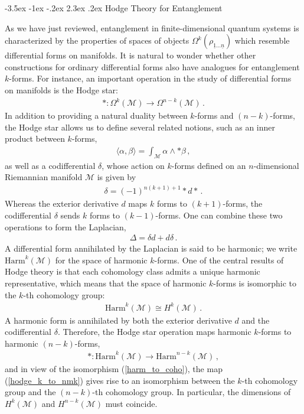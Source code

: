 \documentclass[12pt]{article}
\makeatletter
\newcommand{\ul}[1]{{\underline{#1}}}
\renewcommand\section{\@startsection {section}{1}{\z@}%
                                   {-3.5ex \@plus -1ex \@minus -.2ex}%
                                   {2.3ex \@plus.2ex}%
                                   {\normalfont\large\bfseries}}
\numberwithin{equation}{section}
\newcommand{\rhooneton}{{\rho_{\ul{1} \ldots \ul{n}}}}
\makeatother
\begin{document}
\section{Hodge Theory for Entanglement}\label{sec:hodge}

As we have just reviewed, entanglement in finite-dimensional quantum systems is characterized by the properties of spaces of objects $\Omega^k ( \rhooneton )$ which resemble differential forms on manifolds. It is natural to wonder whether other constructions for ordinary differential forms also have analogues for entanglement $k$-forms. For instance, an important operation in the study of differential forms on manifolds is the Hodge star:
%
\begin{align}
    \ast : \Omega^k ( \mathcal{M} ) \to \Omega^{n - k} ( \mathcal{M} ) \, .
\end{align}
%
In addition to providing a natural duality between $k$-forms and $(n-k)$-forms, the Hodge star allows us to define several related notions, such as an inner product between $k$-forms,
%
\begin{align}\label{forms_inner_product}
    \langle \alpha , \beta \rangle = \int_{\mathcal{M}} \alpha \wedge \ast \beta\, ,
\end{align}
%
as well as a codifferential $\delta$, whose action on $k$-forms defined on an $n$-dimensional Riemannian manifold $\mathcal{M}$ is given by
%
\begin{align}
    \delta = \left( - 1 \right)^{n ( k + 1 ) + 1} \ast d \ast \, .
\end{align}
%
Whereas the exterior derivative $d$ maps $k$ forms to $(k+1)$-forms, the codifferential $\delta$ sends $k$ forms to $(k-1)$-forms. One can combine these two operations to form the Laplacian,
%
\begin{align}
    \Delta = \delta d + d \delta \, .
\end{align}
%
A differential form annihilated by the Laplacian is said to be harmonic; we write $\mathrm{Harm}^k ( \mathcal{M} )$ for the space of harmonic $k$-forms. One of the central results of Hodge theory is that each cohomology class admits a unique harmonic representative, which means that the space of harmonic $k$-forms is isomorphic to the $k$-th cohomology group:
%
\begin{align}\label{harm_to_coho}
    \mathrm{Harm}^k ( \mathcal{M} ) \cong H^k ( \mathcal{M} ) \, .
\end{align}
%
A harmonic form is annihilated by both the exterior derivative $d$ and the codifferential $\delta$. Therefore, the Hodge star operation maps harmonic $k$-forms to harmonic $(n-k)$-forms,
%
\begin{align}\label{hodge_k_to_nmk}
    \ast : \mathrm{Harm}^k ( \mathcal{M} ) \to \mathrm{Harm}^{n-k} ( \mathcal{M} ) \, ,
\end{align}
%
and in view of the isomorphism (\ref{harm_to_coho}), the map (\ref{hodge_k_to_nmk}) gives rise to an isomorphism between the $k$-th cohomology group and the $(n-k)$-th cohomology group. In particular, the dimensions of $H^k ( \mathcal{M} )$ and $ H^{n-k} ( \mathcal{M} )$ must coincide.
\end{document}
